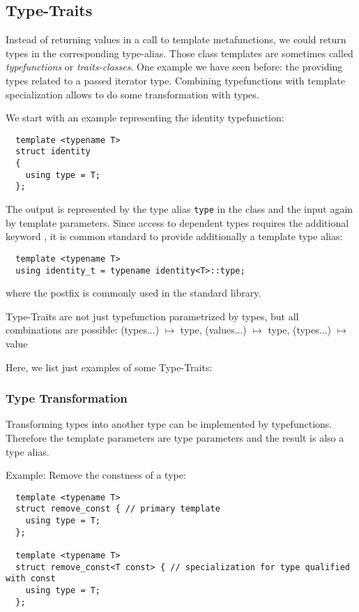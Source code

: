\subsection{Type-Traits}
Instead of returning values in a call to template metafunctions, we could return types in the corresponding type-alias. Those class templates are
sometimes called \emph{typefunctions} or \emph{traits-classes}. One example we have seen before: the  providing types related
to a passed iterator type. Combining typefunctions with template specialization allows to do some transformation with types.

We start with an example representing the identity typefunction:
%
\begin{verbatim}
  template <typename T>
  struct identity
  {
    using type = T;
  };
\end{verbatim}
%
The output is represented by the type alias \texttt{type} in the class and the input again by template parameters. Since access to dependent types
requires the additional keyword , it is common standard to provide additionally a template type alias:
%
\begin{verbatim}
  template <typename T>
  using identity_t = typename identity<T>::type;
\end{verbatim}
%
where the postfix  is commonly used in the standard library.

Type-Traits are not just typefunction parametrized by types, but all combinations are possible: (types...) $\mapsto$ type, (values...) $\mapsto$ type,
(types...) $\mapsto$ value

Here, we list just examples of some Type-Traits:

\subsubsection{Type Transformation}
Transforming types into another type can be implemented by typefunctions. Therefore the template parameters are type parameters and the result is
also a type alias.

Example: Remove the constness of a type:
\begin{verbatim}
  template <typename T>
  struct remove_const { // primary template
    using type = T;
  };

  template <typename T>
  struct remove_const<T const> { // specialization for type qualified with const
    using type = T;
  };
\end{verbatim}

